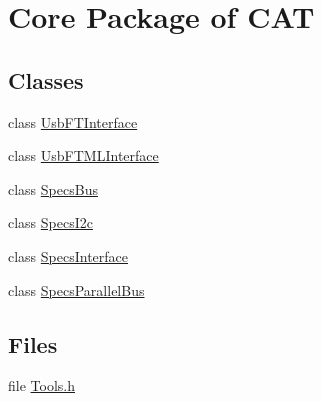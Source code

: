 \hypertarget{group__CATCore}{
\section{Core Package of CAT}
\label{group__CATCore}
}
\subsection*{Classes}
\begin{DoxyCompactItemize}
\item 
class \hyperlink{classUsbFTInterface}{UsbFTInterface}
\item 
class \hyperlink{classUsbFTMLInterface}{UsbFTMLInterface}
\item 
class \hyperlink{classSpecsBus}{SpecsBus}
\item 
class \hyperlink{classSpecsI2c}{SpecsI2c}
\item 
class \hyperlink{classSpecsInterface}{SpecsInterface}
\item 
class \hyperlink{classSpecsParallelBus}{SpecsParallelBus}
\end{DoxyCompactItemize}
\subsection*{Files}
\begin{DoxyCompactItemize}
\item 
file \hyperlink{Tools_8h}{Tools.h}
\end{DoxyCompactItemize}
